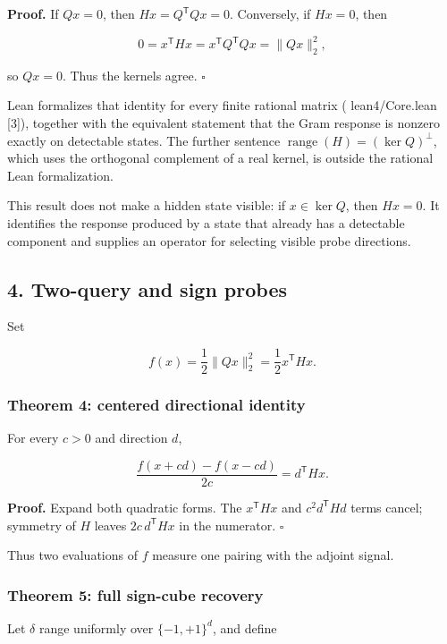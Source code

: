 \documentclass[
  11pt,
]{article}
\theoremstyle{plain}
\theoremstyle{definition}\newtheorem{definition}[theorem]{Definition}
\theoremstyle{remark}\newtheorem*{remark}{Remark}
\DeclareRobustCommand{\texttt}[1]{%
  \ifmmode
    \mathtt{#1}%
  \else
    {\ttfamily\small\renewcommand{\_}{\symbol{95}\allowbreak}#1}%
  \fi}
\begin{document}
\textbf{Proof.} If \(Qx=0\), then \(Hx=Q^{\mathsf T}Qx=0\). Conversely, if
\(Hx=0\), then

\[
0=x^{\mathsf T}Hx=x^{\mathsf T}Q^{\mathsf T}Qx
=\lVert Qx\rVert_2^2,
\]

so \(Qx=0\). Thus the kernels agree. \(\square\)

Lean formalizes that identity for every finite rational matrix (\texttt{lean4/Core.lean} {[}3{]}), together with the
equivalent statement that the Gram response is nonzero exactly on detectable
states. The further sentence \(\operatorname{range}(H)=(\ker Q)^\perp\), which
uses the orthogonal complement of a real kernel, is outside the rational Lean
formalization.

This result does not make a hidden state visible: if \(x\in\ker Q\), then
\(Hx=0\). It identifies the response produced by a state that already has a
detectable component and supplies an operator for selecting visible probe
directions.

\subsection{4. Two-query and sign probes}\label{two-query-and-sign-probes}

Set

\[
f(x)=\frac12\lVert Qx\rVert_2^2=\frac12x^{\mathsf T}Hx.
\]

\subsubsection{Theorem 4: centered directional identity}\label{theorem-4-centered-directional-identity}

For every \(c>0\) and direction \(d\),

\[
\frac{f(x+cd)-f(x-cd)}{2c}=d^{\mathsf T}Hx.
\]

\textbf{Proof.} Expand both quadratic forms. The \(x^{\mathsf T}Hx\) and
\(c^2d^{\mathsf T}Hd\) terms cancel; symmetry of \(H\) leaves
\(2c\,d^{\mathsf T}Hx\) in the numerator. \(\square\)

Thus two evaluations of \(f\) measure one pairing with the adjoint signal.

\subsubsection{Theorem 5: full sign-cube recovery}\label{theorem-5-full-sign-cube-recovery}

Let \(\delta\) range uniformly over \(\{-1,+1\}^{d}\), and define
\end{document}
